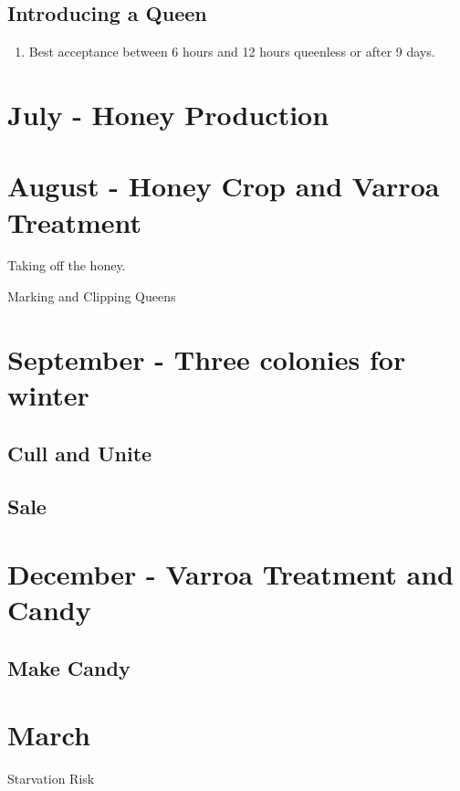 \documentclass{./BeekeepingBook}
\begin{document}
\subsection{Introducing a Queen}
 
 \begin{enumerate}
	\item{Best acceptance between 6 hours and 12 hours queenless or after 9 days.}
\end{enumerate}
 
 
 
\section{July - Honey Production}


 
\section{August - Honey Crop and Varroa Treatment}

Taking off the honey.

Marking and Clipping Queens


\section{September - Three colonies for winter}

\subsection{Cull and Unite}


\subsection{Sale}

\section{December - Varroa Treatment and Candy}

\subsection{Make Candy}




\section{March}{Starvation Risk}
 
\end{document}
